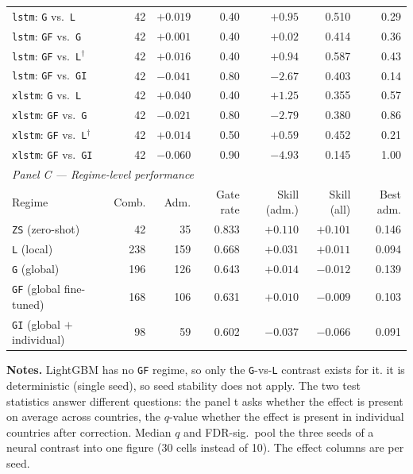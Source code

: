 \begin{table}[htbp]
\begin{tabular}{lrrrrrr}
    \texttt{lstm}: \texttt{G} vs.\ \texttt{L}                & 42 & $+0.019$ & 0.40 & $+0.95$ & 0.510 & 0.29 \\
    \texttt{lstm}: \texttt{GF} vs.\ \texttt{G}               & 42 & $+0.001$ & 0.40 & $+0.02$ & 0.414 & 0.36 \\
    \texttt{lstm}: \texttt{GF} vs.\ \texttt{L}$^\dagger$     & 42 & $+0.016$ & 0.40 & $+0.94$ & 0.587 & 0.43 \\
    \texttt{lstm}: \texttt{GF} vs.\ \texttt{GI}              & 42 & $-0.041$ & 0.80 & $-2.67$ & 0.403 & 0.14 \\
    \texttt{xlstm}: \texttt{G} vs.\ \texttt{L}               & 42 & $+0.040$ & 0.40 & $+1.25$ & 0.355 & 0.57 \\
    \texttt{xlstm}: \texttt{GF} vs.\ \texttt{G}              & 42 & $-0.021$ & 0.80 & $-2.79$ & 0.380 & 0.86 \\
    \texttt{xlstm}: \texttt{GF} vs.\ \texttt{L}$^\dagger$    & 42 & $+0.014$ & 0.50 & $+0.59$ & 0.452 & 0.21 \\
    \texttt{xlstm}: \texttt{GF} vs.\ \texttt{GI}             & 42 & $-0.060$ & 0.90 & $-4.93$ & 0.145 & 1.00 \\
    \midrule
    \multicolumn{7}{l}{\emph{Panel C --- Regime-level performance}} \\
    \midrule
    Regime & Comb. & Adm. & Gate rate & Skill (adm.) & Skill (all) & Best adm. \\
    \midrule
    \texttt{ZS} (zero-shot)              &  42 &  35 & 0.833 & $+0.110$ & $+0.101$ & 0.146 \\
    \texttt{L}  (local)                  & 238 & 159 & 0.668 & $+0.031$ & $+0.011$ & 0.094 \\
    \texttt{G}  (global)                 & 196 & 126 & 0.643 & $+0.014$ & $-0.012$ & 0.139 \\
    \texttt{GF} (global fine-tuned)      & 168 & 106 & 0.631 & $+0.010$ & $-0.009$ & 0.103 \\
    \texttt{GI} (global $+$ individual)  &  98 &  59 & 0.602 & $-0.037$ & $-0.066$ & 0.091 \\
    \bottomrule
  \end{tabular}

  \vspace{0.5em}
  \footnotesize\raggedright
  \textbf{Notes.} LightGBM has no \texttt{GF} regime, so only the
  \texttt{G}-vs-\texttt{L} contrast exists for it. it is deterministic
  (single seed), so seed stability does not apply. The two test statistics answer
  different questions: the panel t asks whether the effect is
  present on average across countries, the $q$-value whether the effect is present in individual countries after correction. Median $q$ and FDR-sig.\ pool the three seeds of a neural contrast into one figure (30
  cells instead of 10). The effect columns are per seed.
\end{table}

